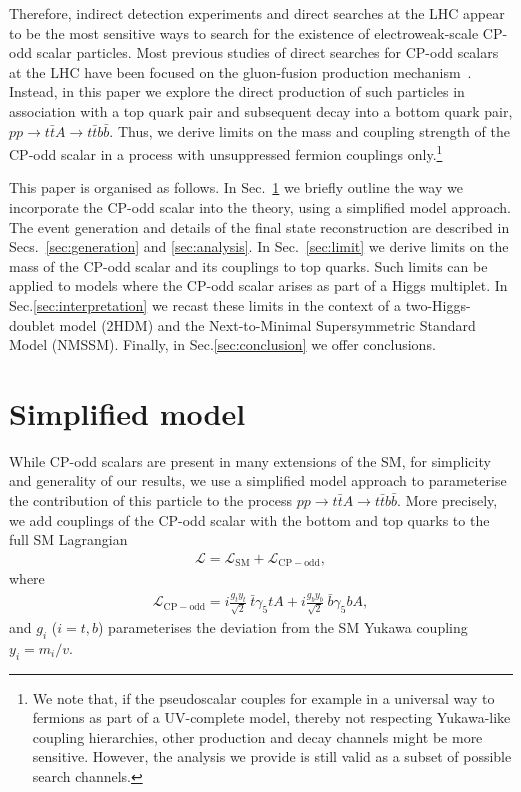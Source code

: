 \documentclass[preprintnumbers,superscriptaddress,nofootinbib,aps,prd,floatfix]{revtex4}
\begin{document}
Therefore, indirect detection experiments and direct searches at the LHC appear to be the most sensitive ways to search for the existence of electroweak-scale CP-odd scalar particles. Most previous studies of direct searches for CP-odd scalars at the LHC have been focused on the gluon-fusion production mechanism~\cite{Klamke:2007cu,Dolan:2014upa}. Instead, in this paper we explore the direct production of such particles in association with a top quark pair and subsequent decay into a bottom quark pair, $p p \to t \bar{t} A \to t \bar{t} b \bar{b}$. Thus, we derive limits on the mass and coupling strength of the CP-odd scalar in a process with unsuppressed fermion couplings only.\footnote{We note that, if the pseudoscalar couples for example in a universal way to fermions as part of a UV-complete model, thereby not respecting Yukawa-like coupling hierarchies, other production and decay channels might be more sensitive. However, the analysis we provide is still valid as a subset of possible search channels.}

This paper is organised as follows. In Sec.~\ref{sec:model} we briefly outline the way we incorporate the CP-odd scalar into the theory, using a simplified model approach. The event generation and details of the final state reconstruction are described in Secs.~\ref{sec:generation} and \ref{sec:analysis}. In Sec.~\ref{sec:limit} we derive limits on the mass of the CP-odd scalar and its couplings to top quarks. Such limits can be applied to models where the CP-odd scalar arises as part of a Higgs multiplet. In Sec.\ref{sec:interpretation} we recast these limits in the context of a two-Higgs-doublet model (2HDM) and the 
Next-to-Minimal Supersymmetric Standard Model (NMSSM). Finally, in Sec.\ref{sec:conclusion} we offer conclusions.

\section{Simplified model}
\label{sec:model}
While CP-odd scalars are present in many extensions of the SM, for simplicity and generality of our results, we use a simplified model approach \cite{Alves:2011wf} to parameterise the contribution of this particle to the process $p p \to t \bar{t} A \to t \bar{t} b \bar{b}$. More precisely, we add couplings of the CP-odd scalar with the bottom and top quarks to the full SM Lagrangian 
\begin{eqnarray}
\mathcal{L} = \mathcal{L}_{\mathrm{SM}} + \mathcal{L}_{\mathrm{CP-odd}},
\label{eq:lagrangian}
\end{eqnarray}
where 
\begin{eqnarray}
\mathcal{L}_{\mathrm{CP-odd}} = i \frac{g_{t} y_t}{\sqrt{2}}~\bar{t} \gamma_5 t A + i \frac{g_{b} y_b}{\sqrt{2}}~\bar{b} \gamma_5 b A,
\label{eq:lagnew}
\end{eqnarray}
and $g_i$ ($i=t,b$) parameterises the deviation from the SM Yukawa coupling  $y_i = m_i/v$.
\end{document}
